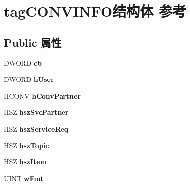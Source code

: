 \hypertarget{structtag_c_o_n_v_i_n_f_o}{}\section{tag\+C\+O\+N\+V\+I\+N\+F\+O结构体 参考}
\label{structtag_c_o_n_v_i_n_f_o}
\subsection*{Public 属性}
\begin{DoxyCompactItemize}
\item 
\mbox{\label{structtag_c_o_n_v_i_n_f_o_af2c06432fa0d3607aadfcc9ced29c06e}} 
D\+W\+O\+RD {\bfseries cb}
\item 
\mbox{\label{structtag_c_o_n_v_i_n_f_o_ac05744b3fb4ed492cca1a92ef90dd7b7}} 
D\+W\+O\+RD {\bfseries h\+User}
\item 
\mbox{\label{structtag_c_o_n_v_i_n_f_o_ad119ceeb066e5e737de7d8d8eec22e79}} 
H\+C\+O\+NV {\bfseries h\+Conv\+Partner}
\item 
\mbox{\label{structtag_c_o_n_v_i_n_f_o_a59e8d4b7d3c585211f727586eb201b31}} 
H\+SZ {\bfseries hsz\+Svc\+Partner}
\item 
\mbox{\label{structtag_c_o_n_v_i_n_f_o_aecb833ab13889ed21dad93386b5bcde9}} 
H\+SZ {\bfseries hsz\+Service\+Req}
\item 
\mbox{\label{structtag_c_o_n_v_i_n_f_o_a8af6ef8478b3c8cae884367528ec678a}} 
H\+SZ {\bfseries hsz\+Topic}
\item 
\mbox{\label{structtag_c_o_n_v_i_n_f_o_a95a6713637ee3e3854774d1bd4eb98ac}} 
H\+SZ {\bfseries hsz\+Item}
\item 
\mbox{\label{structtag_c_o_n_v_i_n_f_o_a855782cd72b5a66b4232f0aee0378a96}} 
U\+I\+NT {\bfseries w\+Fmt}
\item 
\mbox{\label{structtag_c_o_n_v_i_n_f_o_ae57d88a090ef09c558c37d9bb04dfa58}} 

\end{DoxyCompactItemize}
